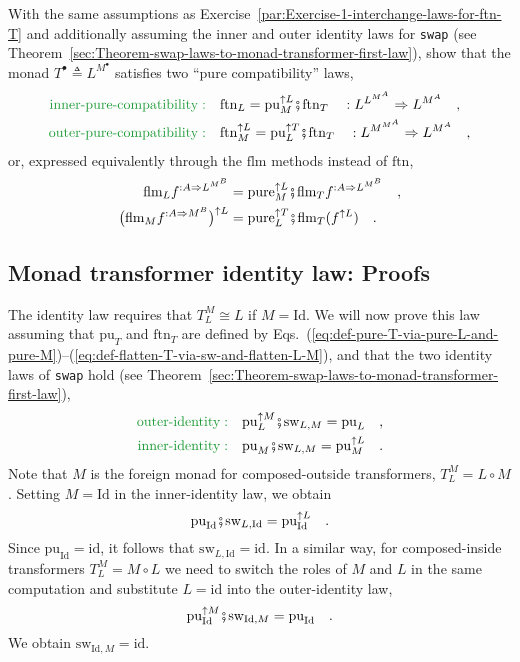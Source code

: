 With the same assumptions as Exercise~\ref{par:Exercise-1-interchange-laws-for-ftn-T}
and additionally assuming the inner and outer identity laws for \lstinline!swap!
(see Theorem~\ref{sec:Theorem-swap-laws-to-monad-transformer-first-law}),
show that the monad $T^{\bullet}\triangleq L^{M^{\bullet}}$ satisfies
two ``pure compatibility'' laws,\textbf{}
\begin{align*}
{\color{greenunder}\text{inner-pure-compatibility}:}\quad & \text{ftn}_{L}=\text{pu}_{M}^{\uparrow L}\bef\text{ftn}_{T}\quad:L^{L^{M^{A}}}\Rightarrow L^{M^{A}}\quad,\\
{\color{greenunder}\text{outer-pure-compatibility}:}\quad & \text{ftn}_{M}^{\uparrow L}=\text{pu}_{L}^{\uparrow T}\bef\text{ftn}_{T}\quad:L^{M^{M^{A}}}\Rightarrow L^{M^{A}}\quad,
\end{align*}
or, expressed equivalently through the $\text{flm}$ methods instead
of $\text{ftn}$,
\begin{align*}
\text{flm}_{L}f^{:A\Rightarrow L^{M^{B}}} & =\text{pure}_{M}^{\uparrow L}\bef\text{flm}_{T}f^{:A\Rightarrow L^{M^{B}}}\quad,\\
\big(\text{flm}_{M}f^{:A\Rightarrow M^{B}}\big)^{\uparrow L} & =\text{pure}_{L}^{\uparrow T}\bef\text{flm}_{T}(f^{\uparrow L})\quad.
\end{align*}


\subsection{Monad transformer identity law: Proofs}

The identity law requires that $T_{L}^{M}\cong L$ if $M=\text{Id}$.
We will now prove this law assuming that $\text{pu}_{T}$ and $\text{ftn}_{T}$
are defined by Eqs.~(\ref{eq:def-pure-T-via-pure-L-and-pure-M})–(\ref{eq:def-flatten-T-via-sw-and-flatten-L-M}),
and that the two identity laws of \lstinline!swap!
hold (see Theorem~\ref{sec:Theorem-swap-laws-to-monad-transformer-first-law}),
\begin{align*}
{\color{greenunder}\text{outer-identity}:}\quad & \text{pu}_{L}^{\uparrow M}\bef\text{sw}_{L,M}=\text{pu}_{L}\quad,\\
{\color{greenunder}\text{inner-identity}:}\quad & \text{pu}_{M}\bef\text{sw}_{L,M}=\text{pu}_{M}^{\uparrow L}\quad.
\end{align*}
Note that $M$ is the foreign monad for composed-outside transformers,
$T_{L}^{M}=L\circ M$. Setting $M=\text{Id}$ in the inner-identity
law, we obtain 
\[
\text{pu}_{\text{Id}}\bef\text{sw}_{L,\text{Id}}=\text{pu}_{\text{Id}}^{\uparrow L}\quad.
\]
Since $\text{pu}_{\text{Id}}=\text{id}$, it follows that $\text{sw}_{L,\text{Id}}=\text{id}$.
In a similar way, for composed-inside transformers $T_{L}^{M}=M\circ L$
we need to switch the roles of $M$ and $L$ in the same computation
and substitute $L=\text{id}$ into the outer-identity law,
\[
\text{pu}_{\text{Id}}^{\uparrow M}\bef\text{sw}_{\text{Id},M}=\text{pu}_{\text{Id}}\quad.
\]
 We obtain $\text{sw}_{\text{Id},M}=\text{id}$.

